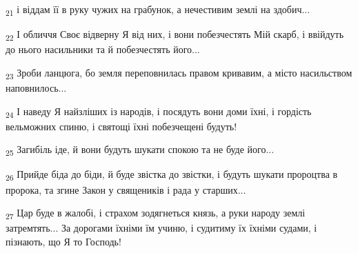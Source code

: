 \begin{tcolorbox}
\textsubscript{21} і віддам її в руку чужих на грабунок, а нечестивим землі на здобич...
\end{tcolorbox}
\begin{tcolorbox}
\textsubscript{22} І обличчя Своє відверну Я від них, і вони побезчестять Мій скарб, і ввійдуть до нього насильники та й побезчестять його...
\end{tcolorbox}
\begin{tcolorbox}
\textsubscript{23} Зроби ланцюга, бо земля переповнилась правом кривавим, а місто насильством наповнилось...
\end{tcolorbox}
\begin{tcolorbox}
\textsubscript{24} І наведу Я найзліших із народів, і посядуть вони доми їхні, і гордість вельможних спиню, і святощі їхні побезчещені будуть!
\end{tcolorbox}
\begin{tcolorbox}
\textsubscript{25} Загибіль іде, й вони будуть шукати спокою та не буде його...
\end{tcolorbox}
\begin{tcolorbox}
\textsubscript{26} Прийде біда до біди, й буде звістка до звістки, і будуть шукати пророцтва в пророка, та згине Закон у священиків і рада у старших...
\end{tcolorbox}
\begin{tcolorbox}
\textsubscript{27} Цар буде в жалобі, і страхом зодягнеться князь, а руки народу землі затремтять... За дорогами їхніми їм учиню, і судитиму їх їхніми судами, і пізнають, що Я то Господь!
\end{tcolorbox}
